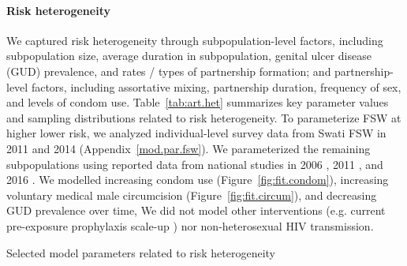 \paragraph{Risk heterogeneity}
We captured risk heterogeneity through subpopulation-level factors, including
subpopulation size, average duration in subpopulation,
genital ulcer disease (GUD) prevalence, and rates / types of partnership formation;
and partnership-level factors, including
assortative mixing, partnership duration, frequency of sex, and levels of condom use.
Table~\ref{tab:art.het} summarizes key parameter values and sampling distributions related to risk heterogeneity.
To parameterize FSW at higher \vs lower risk, we analyzed individual-level survey data
from Swati FSW in 2011 \cite{Baral2014} and 2014 \cite{EswKP2014} (Appendix~\ref{mod.par.fsw}).
We parameterized the remaining subpopulations using reported data from national studies in
2006 \cite{SDHS2006}, 2011 \cite{SHIMS1}, and 2016 \cite{SHIMS2}.
We modelled
increasing condom use (Figure~\ref{fig:fit.condom}),
increasing voluntary medical male circumcision (Figure~\ref{fig:fit.circum}), and
decreasing GUD prevalence over time,
We did not model other interventions
(e.g. current pre-exposure prophylaxis scale-up \cite{EswCOP21})
nor non-heterosexual HIV transmission.
\begin{table}
  \centering
  \caption{Selected model parameters related to risk heterogeneity}
  
  \label{tab:art.het}
\end{table}
